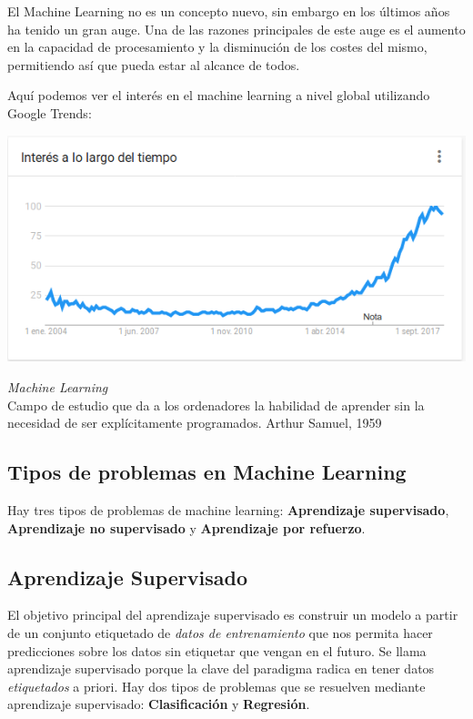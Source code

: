 El Machine Learning no es un concepto nuevo, sin embargo en los últimos años ha tenido un gran auge. Una de las  razones principales de este auge es  el  aumento  en  la  capacidad  de  procesamiento  y  la  disminución  de  los  costes  del mismo, permitiendo así que pueda estar al alcance de todos.

Aquí podemos ver el interés en el machine learning a nivel global utilizando Google Trends:
\begin{center}
\includegraphics[scale=0.7]{./img/ml_google_trends.png} 
\end{center}

\begin{definicion}
\emph{Machine Learning}\\
Campo  de  estudio  que  da  a  los  ordenadores  la  habilidad  de  aprender  sin  la  
necesidad de ser explícitamente programados. 
Arthur Samuel, 1959
\end{definicion}

\subsection{Tipos de problemas en Machine Learning}
Hay tres tipos de problemas de machine learning: \textbf{Aprendizaje supervisado}, \textbf{Aprendizaje no supervisado} y \textbf{Aprendizaje por refuerzo}.  

\subsection{Aprendizaje Supervisado}
El objetivo principal del aprendizaje supervisado es construir un modelo a partir de un conjunto etiquetado de \textit{datos de entrenamiento} que nos permita hacer predicciones sobre los datos sin etiquetar que vengan en el futuro.  
Se llama aprendizaje supervisado porque la clave del paradigma radica en tener datos \textit{etiquetados} a priori.  
Hay dos tipos de problemas que se resuelven mediante aprendizaje supervisado:  
\textbf{Clasificación} y \textbf{Regresión}.

